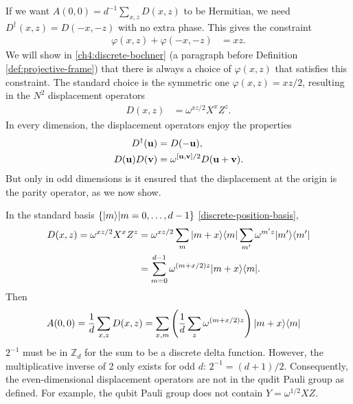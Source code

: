 If we want $A(0,0) = d^{-1}\sum_{x,z} D(x,z)$ to be Hermitian, we need $D^{\dagger}(x,z) = D(-x,-z)$ with no extra phase. This gives the constraint
\begin{align}
	\varphi(x,z) + \varphi(-x,-z) &= xz.
\end{align}
We will show in \autoref{ch4:discrete-bochner} (a paragraph before Definition \ref{def:projective-frame}) that there is always a choice of $\varphi(x,z)$ that satisfies this constraint. The standard choice is the symmetric one $\varphi(x,z) = xz/2$, resulting in the $N^2$ displacement operators
\begin{align}
D(x,z) &= \omega^{xz/2} X^x Z^z. \label{discrete-displacement-operator}
\end{align}
In every dimension, the displacement operators enjoy the properties
\begin{align}
D^{\dagger}({\bf u}) &= D({\bf -u}), \\
D({\bf u}) D({\bf v}) &= \omega^{[{\bf u},{\bf v}]/2} D({\bf u+v}) \label{discrete-weyl-heisenberg}.
\end{align}
But only in odd dimensions is it ensured that the displacement at the origin is the parity operator, as we now show.

In the standard basis $\{{\left\vert{m}\right\rangle}| m=0,\dots, d-1 \}$ \eqref{discrete-position-basis},
\begin{align}
	D(x,z) = \omega^{xz/2} X^x Z^z
		&= \omega^{xz/2} \sum_m {\left\vert{m+x}\right\rangle}{\left\langle{m}\right\vert} \sum_{m'} \omega^{m'z} {\left\vert{m'}\right\rangle}{\left\langle{m'}\right\vert} \nonumber \\
		&= \sum_{m=0}^{d-1} \omega^{(m+x/2)z} {\left\vert{m+x}\right\rangle}{\left\langle{m}\right\vert}.
\end{align}
Then
\begin{align}
	A(0,0) = \frac{1}{d} \sum_{x,z} D(x,z)
		&= \sum_{x,m} \left( \frac{1}{d} \sum_z \omega^{(m+x/2)z} \right) {\left\vert{m+x}\right\rangle}{\left\langle{m}\right\vert}
\end{align}
$2^{-1}$ must be in $\mathbb{Z}_d$ for the sum to be a discrete delta function. However, the multiplicative inverse of 2 only exists for odd $d$: $2^{-1} = (d+1)/2$. Consequently, the even-dimensional displacement operators are not in the qudit Pauli group as defined. For example, the qubit Pauli group does not contain $Y = \omega^{1/2}XZ$.

